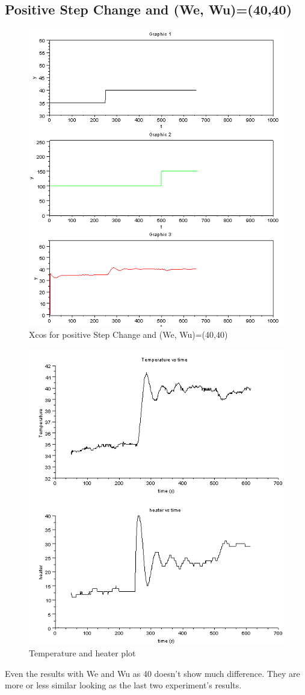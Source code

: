 \subsection{Positive Step Change and (We, Wu)=(40,40)}
\begin{figure}[H]
\centering
  \includegraphics[width=0.8\linewidth]{mpc/1_3.PNG}
  \caption{Xcos for positive Step Change and (We, Wu)=(40,40)}
\end{figure}
\begin{figure}[H]
\centering
  \includegraphics[width=0.8\linewidth]{mpc/1_3_heater_final.png}
  \caption{Temperature and heater plot}
\end{figure}
Even the results with We and Wu as 40 doesn't show much difference. They are more or less similar looking as the last two experiment's results.


